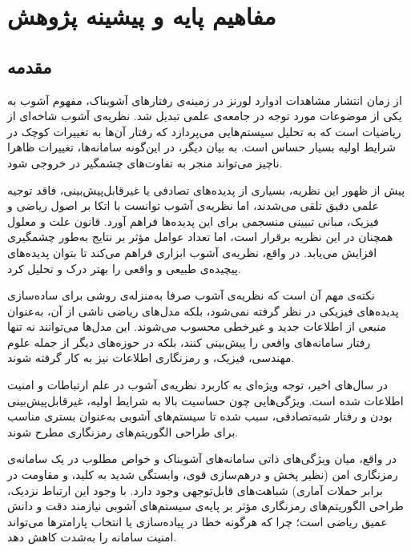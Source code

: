 
\chapter{مفاهیم پایه و پیشینه پژوهش}
\section{مقدمه}

از زمان انتشار مشاهدات ادوارد لورنز در زمینه‌ی رفتارهای آشوبناک، مفهوم آشوب به یکی از موضوعات مورد توجه در جامعه‌ی علمی تبدیل شد. نظریه‌ی آشوب شاخه‌ای از ریاضیات است که به تحلیل سیستم‌هایی می‌پردازد که رفتار آن‌ها به تغییرات کوچک در شرایط اولیه بسیار حساس است. به بیان دیگر، در این‌گونه سامانه‌ها، تغییرات ظاهرا ناچیز می‌تواند منجر به تفاوت‌های چشمگیر در خروجی شود.

پیش از ظهور این نظریه، بسیاری از پدیده‌های تصادفی یا غیرقابل‌پیش‌بینی، فاقد توجیه علمی دقیق تلقی می‌شدند، اما نظریه‌ی آشوب توانست با اتکا بر اصول ریاضی و فیزیک، مبانی تبیینی منسجمی برای این پدیده‌ها فراهم آورد. قانون علت و معلول همچنان در این نظریه برقرار است، اما تعداد عوامل مؤثر بر نتایج به‌طور چشمگیری افزایش می‌یابد. در واقع، نظریه‌ی آشوب ابزاری فراهم می‌کند تا بتوان پدیده‌های پیچیده‌ی طبیعی و واقعی را بهتر درک و تحلیل کرد.

نکته‌ی مهم آن است که نظریه‌ی آشوب صرفا به‌منزله‌ی روشی برای ساده‌سازی پدیده‌های فیزیکی در نظر گرفته نمی‌شود، بلکه مدل‌های ریاضی ناشی از آن، به‌عنوان منبعی از اطلاعات جدید و غیرخطی محسوب می‌شوند. این مدل‌ها می‌توانند نه تنها رفتار سامانه‌های واقعی را پیش‌بینی کنند، بلکه در حوزه‌های دیگر از جمله علوم مهندسی، فیزیک، و رمزنگاری اطلاعات نیز به کار گرفته شوند.

در سال‌های اخیر، توجه ویژه‌ای به کاربرد نظریه‌ی آشوب در علم ارتباطات و امنیت اطلاعات شده است. ویژگی‌هایی چون حساسیت بالا به شرایط اولیه، غیرقابل‌پیش‌بینی بودن و رفتار شبه‌تصادفی، سبب شده تا سیستم‌های آشوبی به‌عنوان بستری مناسب برای طراحی الگوریتم‌های رمزنگاری مطرح شوند.

در واقع، میان ویژگی‌های ذاتی سامانه‌های آشوبناک و خواص مطلوب در یک سامانه‌ی رمزنگاری امن (نظیر پخش و درهم‌سازی قوی، وابستگی شدید به کلید، و مقاومت در برابر حملات آماری) شباهت‌های قابل‌توجهی وجود دارد. با وجود این ارتباط نزدیک، طراحی الگوریتم‌های رمزنگاری مؤثر بر پایه‌ی سیستم‌های آشوبی نیازمند دقت و دانش عمیق ریاضی است؛ چرا که هرگونه خطا در پیاده‌سازی یا انتخاب پارامترها می‌تواند امنیت سامانه را به‌شدت کاهش دهد.


